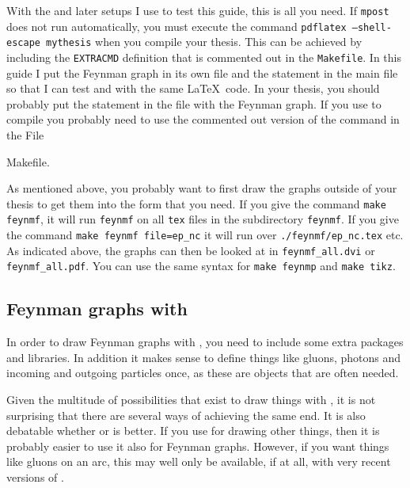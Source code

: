 With the  and later setups I use to test this guide,
this is all you need. If \texttt{mpost} does not run automatically,
you must execute the command \texttt{pdflatex --shell-escape
  mythesis} when you compile your thesis. This can be achieved by
including the \texttt{EXTRACMD} definition that is commented out in
the \texttt{Makefile}. In this guide I put the Feynman graph in its
own file and the  statement in the main file so that
I can test  and  with the same
\LaTeX\ code. In your thesis, you should probably put the
 statement in the file with the Feynman graph.
If you use  to compile you probably need to use 
the commented out version of the  command in the File{{Makefile}.

As mentioned above, you probably want to first draw the graphs outside
of your thesis to get them into the form that you need. If you give
the command \texttt{make feynmf}, it will run \texttt{feynmf} on all
\texttt{tex} files in the subdirectory \texttt{feynmf}. If you give
the command \texttt{make feynmf file=ep\_nc} it will run over
\texttt{./feynmf/ep\_nc.tex} etc. As indicated above, the graphs can
then be looked at in \texttt{feynmf\_all.dvi} or\\
\texttt{feynmf\_all.pdf}. You can use the same syntax for
\texttt{make feynmp} and \texttt{make tikz}.


\subsection{Feynman graphs with \TikZ}
\label{sec:fig:feynman:tikz}

In order to draw Feynman graphs with \TikZ, you need to include some
extra \TikZ packages and libraries. In addition it makes sense to
define things like gluons, photons and incoming and outgoing particles
once, as these are objects that are often needed.

Given the multitude of possibilities that exist to draw things with
\TikZ, it is not surprising that there are several ways of achieving the
same end. It is also debatable whether  or 
is better. If you use \TikZ for drawing other things, then it is
probably easier to use it also for Feynman graphs. However, if you
want things like gluons on an arc, this may well only be available, if
at all, with very recent versions of .

}

